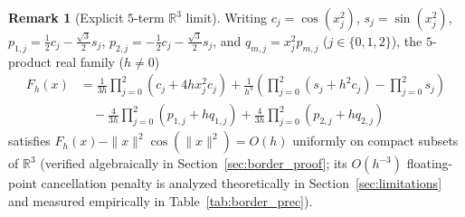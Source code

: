 \documentclass[11pt,a4paper]{article}
\theoremstyle{plain}
\theoremstyle{definition}
\newtheorem{remark}[theorem]{Remark}
\newcommand{\R}{\mathbb{R}}
\begin{document}
\begin{remark}[Explicit $5$-term $\R^3$ limit]\label{rem:border_sharpness}
Writing $c_j = \cos(x_j^2)$, $s_j = \sin(x_j^2)$, $p_{1,j} = \frac{1}{2}c_j - \frac{\sqrt{3}}{2}s_j$, $p_{2,j} = -\frac{1}{2}c_j - \frac{\sqrt{3}}{2}s_j$, and $q_{m,j} = x_j^2 p_{m,j}$ ($j \in \{0, 1, 2\}$), the $5$-product real family ($h \ne 0$)
\begin{equation}\label{eq:rank5_family}
\begin{aligned}
  F_h(x) &= \frac{1}{3h}\prod_{j=0}^2 (c_j + 4h x_j^2 c_j)
  + \frac{1}{h^3}\!\left(\prod_{j=0}^2 (s_j + h^2 c_j) - \prod_{j=0}^2 s_j\right)\\
  &\quad - \frac{4}{3h}\prod_{j=0}^2 (p_{1,j} + h q_{1,j})
  + \frac{4}{3h}\prod_{j=0}^2 (p_{2,j} + h q_{2,j})
\end{aligned}
\end{equation}
satisfies $F_h(x) - \|x\|^2\cos(\|x\|^2) = O(h)$ uniformly on compact subsets of $\R^3$ (verified algebraically in Section~\ref{sec:border_proof}; its $O(h^{-3})$ floating-point cancellation penalty is analyzed theoretically in Section~\ref{sec:limitations} and measured empirically in Table~\ref{tab:border_prec}).
\end{remark}
\end{document}
